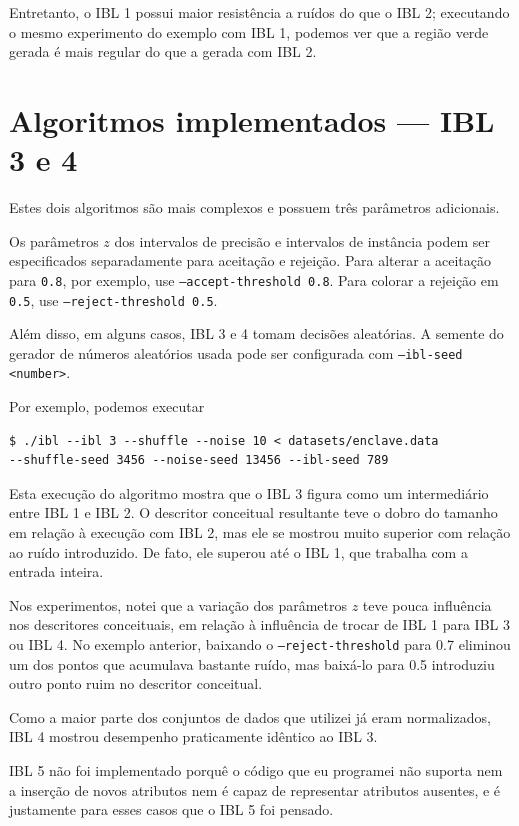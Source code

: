 \documentclass{article}
\begin{document}
Entretanto, o IBL 1 possui maior resistência a ruídos do que o IBL 2;
executando o mesmo experimento do exemplo com IBL 1,
podemos ver que a região verde gerada é mais regular do que a gerada com IBL 2.

\section{Algoritmos implementados --- IBL 3 e 4}

Estes dois algoritmos são mais complexos e possuem três parâmetros adicionais.

Os parâmetros $z$ dos intervalos de precisão e intervalos de instância
podem ser especificados separadamente para aceitação e rejeição.
Para alterar a aceitação para \texttt{0.8}, por exemplo,
use \texttt{--accept-threshold 0.8}.
Para colorar a rejeição em \texttt{0.5},
use \texttt{--reject-threshold 0.5}.

Além disso, em alguns casos, IBL 3 e 4 tomam decisões aleatórias.
A semente do gerador de números aleatórios usada pode ser configurada com
\texttt{--ibl-seed <number>}.

Por exemplo, podemos executar
\begin{verbatim}
$ ./ibl --ibl 3 --shuffle --noise 10 < datasets/enclave.data
--shuffle-seed 3456 --noise-seed 13456 --ibl-seed 789
\end{verbatim}

Esta execução do algoritmo mostra que o IBL 3 figura como um intermediário
entre IBL 1 e IBL 2. O descritor conceitual resultante teve o dobro do tamanho
em relação à execução com IBL 2, mas ele se mostrou muito
superior com relação ao ruído introduzido.
De fato, ele superou até o IBL 1, que trabalha com a entrada inteira.

Nos experimentos, notei que a variação dos parâmetros $z$
teve pouca influência nos descritores conceituais,
em relação à influência de trocar de IBL 1 para IBL 3 ou IBL 4.
No exemplo anterior, baixando o \texttt{--reject-threshold} para 0.7
eliminou um dos pontos que acumulava bastante ruído,
mas baixá-lo para 0.5 introduziu outro ponto ruim no descritor conceitual.

Como a maior parte dos conjuntos de dados que utilizei já eram normalizados,
IBL 4 mostrou desempenho praticamente idêntico ao IBL 3.

IBL 5 não foi implementado porquê o código que eu programei não suporta
nem a inserção de novos atributos nem é capaz de representar atributos ausentes,
e é justamente para esses casos que o IBL 5 foi pensado.
\end{document}
